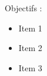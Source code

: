 \documentclass[12pt,frenchb]{article}
\begin{document}
Objectifs :
\begin{minipage}[t]{0.8\linewidth}
    \begin{itemize}
        \item Item 1
        \item Item 2
        \item Item 3
    \end{itemize}
\end{minipage}
\end{document}
